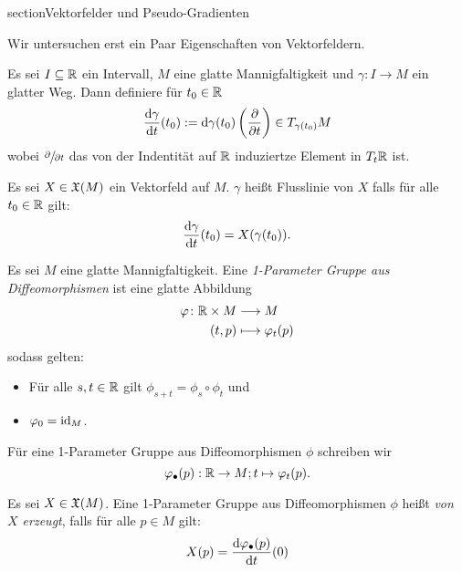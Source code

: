 section{Vektorfelder und Pseudo-Gradienten}

Wir untersuchen erst ein Paar Eigenschaften von Vektorfeldern.

\begin{definition}[Flusslinie]
    \label{def: flussliene}
    Es sei $I \subseteq { \mathbb R }$ ein Intervall, $M$ eine glatte Mannigfaltigkeit und  
    $\gamma \colon I  \to M$ ein glatter Weg. Dann definiere für $t_0 \in { \mathbb R }$
    \[ \derive[\gamma]{t} (t_0) := 
        \opd \gamma (t_0) \left( \pderive{t} \right) \in T_{\gamma(t_0)}M \]
    wobei $\pderive{t}$ das von der Indentität auf ${ \mathbb R }$ induziertze Element in $T_t{ \mathbb R }$ ist.

    Es sei $X \in { \mathfrak{X} } (M)$ ein Vektorfeld auf $M$. $\gamma$ heißt Flusslinie von $X$
    falls für alle $t_0 \in { \mathbb R }$ gilt: 
    \[ \derive[\gamma]{t}(t_0) = X(\gamma(t_0)) . \]
\end{definition}

\begin{definition}
    \label{def: 1-parameter gruppe aus diffeos}
    Es sei $M$ eine glatte Mannigfaltigkeit. Eine 
    \textit{1-Parameter Gruppe aus Diffeomorphismen} ist eine glatte Abbildung
    \begin{align*}
        \varphi \colon { \mathbb R } \times M \longrightarrow & \; M \\
        (t, p) \longmapsto & \; \varphi_t(p)
    \end{align*}
    sodass gelten: 
    \begin{itemize}
        \item Für alle $s, t \in { \mathbb R }$ gilt $\phi_{s + t} = \phi_s \circ \phi_t$ und
        \item $\varphi_0 = { \operatorname{id} }_{M}$.
    \end{itemize}

    Für eine 1-Parameter Gruppe aus Diffeomorphismen $\phi$ schreiben wir 
    \[ \varphi_{\bullet}(p): { \mathbb R } \to M ; t \mapsto \varphi_t(p) . \]

    Es sei $X \in { \mathfrak{X} } (M)$. Eine 1-Parameter Gruppe aus Diffeomorphismen $\phi$ heißt 
    \textit{von $X$ erzeugt}, falls für alle $p \in M$ gilt:
    \[ X(p) = \derive[\phi_{\bullet}(p)]{t}(0) \]
\end{definition}


